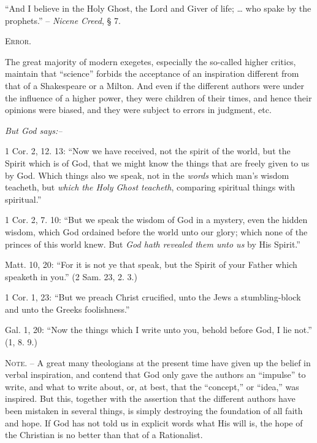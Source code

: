\documentclass[
]{book}
\begin{document}
``And I believe in the Holy Ghost, the Lord and Giver of life; \ldots{} who spake by the prophets.'' -- \emph{Nicene Creed}, § 7.

\begin{center}
\textsc{Error.}
\end{center}

The great majority of modern exegetes, especially the so-called higher critics, maintain that ``science'' forbids the acceptance of an inspiration different from that of a Shakespeare or a Milton. And even if the different authors were under the influence of a higher power, they were children of their times, and hence their opinions were biased, and they were subject to errors in judgment, etc.

\begin{center}
\textsl{But God says:--}
\end{center}

1 Cor. 2, 12. 13: ``Now we have received, not the spirit of the world, but the Spirit which is of God, that we might know the things that are freely given to us by God. Which things also we speak, not in the \emph{words} which man's wisdom teacheth, but \emph{which the Holy Ghost teacheth}, comparing spiritual things with spiritual.''

1 Cor. 2, 7. 10: ``But we speak the wisdom of God in a mystery, even the hidden wisdom, which God ordained before the world unto our glory; which none of the princes of this world knew. But \emph{God hath revealed them unto us} by His Spirit.''

Matt. 10, 20: ``For it is not ye that speak, but the Spirit of your Father which speaketh in you.'' (2 Sam. 23, 2. 3.)

1 Cor. 1, 23: ``But we preach Christ crucified, unto the Jews a stumbling-block and unto the Greeks foolishness.''

Gal. 1, 20: ``Now the things which I write unto you, behold before God, I lie not.'' (1, 8. 9.)

\textsc{Note.} -- A great many theologians at the present time have given up the belief in verbal inspiration, and contend that God only gave the authors an ``impulse'' to write, and what to write about, or, at best, that the ``concept,'' or ``idea,'' was inspired. But this, together with the assertion that the different authors have been mistaken in several things, is simply destroying the foundation of all faith and hope. If God has not told us in explicit words what His will is, the hope of the Christian is no better than that of a Rationalist.
\end{document}
